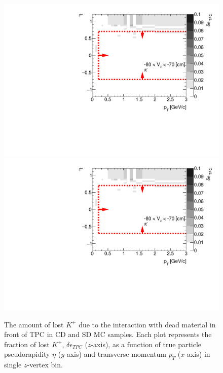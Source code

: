 \begin{figure}[H]
	\caption[The amount of lost $K^+$ due to the interaction with dead material in front of TPC as a function of $p_T$, $\eta$ and $z$-vertex in CD and SD]{The amount of lost $K^+$ due to the interaction with dead material in front of TPC in CD and SD MC samples. Each plot represents the fraction of lost $K^+$, $\delta\epsilon_{ TPC}$ ($z$-axis), as a function of true particle pseudorapidity $\eta$ ($y$-axis) and transverse momentum $p_{T}$ ($x$-axis) in single $z$-vertex bin.}\label{fig:dead_materialCDSD3DKp}
	\parbox{0.325\textwidth}{
		\includegraphics[width=\linewidth,page=65]{graphics/systematicsEfficiency/deadMaterial/secondaries_Unbinned_SDCD_.pdf}\\
		\includegraphics[width=\linewidth,page=68]{graphics/systematicsEfficiency/deadMaterial/secondaries_Unbinned_SDCD_.pdf}\\
}
\end{figure}
